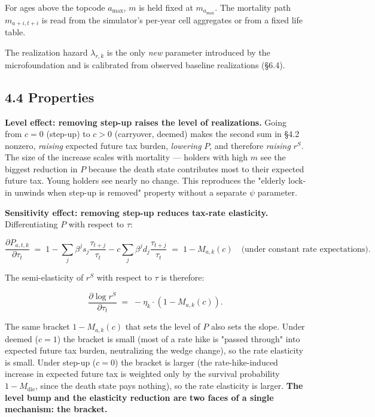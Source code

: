 \documentclass[11pt]{article}
\begin{document}
For ages above the topcode $a_{\max}$, $m$ is held fixed at $m_{a_{\max}}$. The mortality path $m_{a+i, t+i}$ is read from the simulator's per-year cell aggregates or from a fixed life table.

The realization hazard $\lambda_{r,k}$ is the only \emph{new} parameter introduced by the microfoundation and is calibrated from observed baseline realizations (§6.4).

\subsection*{4.4 Properties}

\textbf{Level effect: removing step-up raises the level of realizations.} Going from $c = 0$ (step-up) to $c > 0$ (carryover, deemed) makes the second sum in §4.2 nonzero, \emph{raising} expected future tax burden, \emph{lowering} $P$, and therefore \emph{raising} $r^S$. The size of the increase scales with mortality — holders with high $m$ see the biggest reduction in $P$ because the death state contributes most to their expected future tax. Young holders see nearly no change. This reproduces the "elderly lock-in unwinds when step-up is removed" property without a separate $\psi$ parameter.

\textbf{Sensitivity effect: removing step-up reduces tax-rate elasticity.} Differentiating $P$ with respect to $\tau$:

\[
\frac{\partial P_{a,t,k}}{\partial \tau_t}
\;=\; 1 - \sum_j \beta^j s_j \frac{\tau_{t+j}}{\tau_t} - c \sum_j \beta^j d_j \frac{\tau_{t+j}}{\tau_t}
\;=\; 1 - M_{a,k}(c) \quad \text{(under constant rate expectations).}
\]

The semi-elasticity of $r^S$ with respect to $\tau$ is therefore:

\[
\boxed{
\frac{\partial \log r^S}{\partial \tau_t}
\;=\;
-\eta_k \cdot (1 - M_{a,k}(c)).
}
\]

The same bracket $1 - M_{a,k}(c)$ that sets the level of $P$ also sets the slope. Under deemed ($c = 1$) the bracket is small (most of a rate hike is "passed through" into expected future tax burden, neutralizing the wedge change), so the rate elasticity is small. Under step-up ($c = 0$) the bracket is larger (the rate-hike-induced increase in expected future tax is weighted only by the survival probability $1 - M_{\text{die}}$, since the death state pays nothing), so the rate elasticity is larger. \textbf{The level bump and the elasticity reduction are two faces of a single mechanism: the bracket.}
\end{document}
